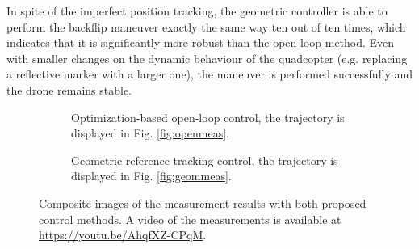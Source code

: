 In spite of the imperfect position tracking, the geometric controller is able to perform the backflip maneuver exactly the same way ten out of ten times, which indicates that it is significantly more robust than the open-loop method. Even with smaller changes on the dynamic behaviour of the quadcopter (e.g. replacing a reflective marker with a larger one), the maneuver is performed successfully and the drone remains stable.



\begin{figure}
\setlength{\fboxsep}{0pt}%
\setlength{\fboxrule}{1pt}
\centering
\begin{subfigure}{.45\textwidth}
  \centering
  \caption{Optimization-based open-loop control, the trajectory is displayed in Fig. \ref{fig:openmeas}.}
  \label{fig:sub1}
\end{subfigure}%
\hspace{1cm}
\begin{subfigure}{.45\textwidth}
  \centering
  \caption{Geometric reference tracking control, the trajectory is displayed in Fig. \ref{fig:geommeas}.}
  \label{fig:sub2}
\end{subfigure}
\caption[Composite images of the measurement results]{Composite images of the measurement results with both proposed control methods. A video of the measurements is available at \url{https://youtu.be/AhqfXZ-CPqM}.}
\label{fig:test}
\end{figure}

